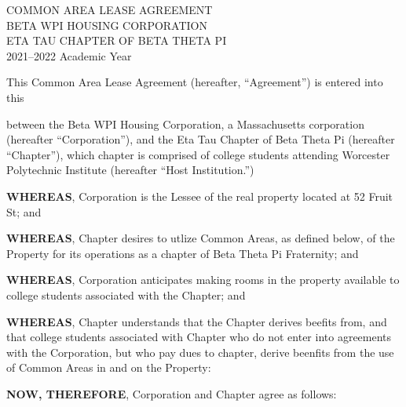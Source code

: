 \documentclass[12pt]{article}
\begin{document}
\begin{center}
        COMMON AREA LEASE AGREEMENT\\
        BETA WPI HOUSING CORPORATION\\
        ETA TAU CHAPTER OF BETA THETA PI\\
        2021--2022 Academic Year
\end{center}

This Common Area Lease Agreement (hereafter, “Agreement”) is entered into this \date{\today} between the Beta WPI Housing Corporation, a Massachusetts corporation (hereafter ``Corporation''), and the Eta Tau Chapter of Beta Theta Pi (hereafter ``Chapter''), which chapter is comprised of college students attending Worcester Polytechnic Institute (hereafter ``Host Institution.'')

\textbf{WHEREAS}, Corporation is the Lessee of the real property located at 52 Fruit St; and

\textbf{WHEREAS}, Chapter desires to utlize Common Areas, as defined below, of the Property for its operations as a chapter of Beta Theta Pi Fraternity; and

\textbf{WHEREAS}, Corporation anticipates making rooms in the property available to college students associated with the Chapter; and

\textbf{WHEREAS}, Chapter understands that the Chapter derives beefits from, and that college students associated with Chapter who do not enter into agreements with the Corporation, but who pay dues to chapter, derive beenfits from the use of Common Areas in and on the Property:

\textbf{NOW, THEREFORE}, Corporation and Chapter agree as follows:
\end{document}
